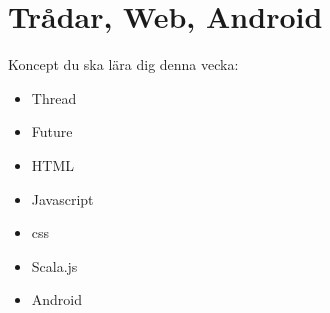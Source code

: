 \chapter{Trådar, Web, Android}\label{chapter:W12}
Koncept du ska lära dig denna vecka:
\begin{multicols}{2}\begin{itemize}[nosep,label={$\square$},leftmargin=*]
\item Thread
\item Future
\item HTML
\item Javascript
\item css
\item Scala.js
\item Android\end{itemize}\end{multicols}
